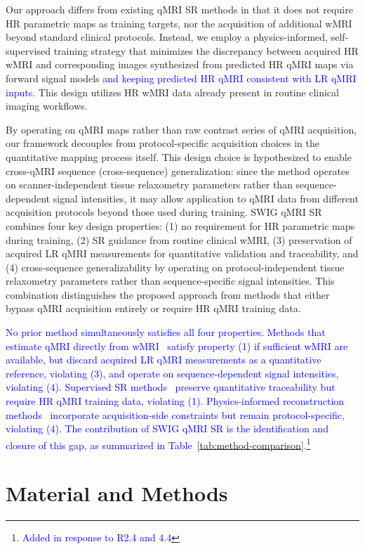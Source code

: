 \documentclass[journal,twoside,web]{ieeecolor}
\newcommand{\added}[1]{\textcolor{blue}{#1}}      %
\begin{document}
Our approach differs from existing qMRI SR methods in that it does not require HR parametric maps as training targets, nor the acquisition of additional wMRI beyond standard clinical protocols. Instead, we employ a physics-informed, self-supervised training strategy that minimizes the discrepancy between acquired HR wMRI and corresponding images synthesized from predicted HR qMRI maps via forward signal models \added{and keeping predicted HR qMRI consistent with LR qMRI inputs}. This design utilizes HR wMRI data already present in routine clinical imaging workflows.

By operating on qMRI maps rather than raw contrast series of qMRI acquisition, our framework decouples from protocol-specific acquisition choices in the quantitative mapping process itself. This design choice is hypothesized to enable cross-qMRI sequence (cross-sequence) generalization: since the method operates on scanner-independent tissue relaxometry parameters rather than sequence-dependent signal intensities, it may allow application to qMRI data from different acquisition protocols beyond those used during training.
SWIG qMRI SR combines four key design properties: (1) no requirement for HR parametric maps during training, (2) SR guidance from routine clinical wMRI, (3) preservation of acquired LR qMRI measurements for quantitative validation and traceability, and (4) cross-sequence generalizability by operating on protocol-independent tissue relaxometry parameters rather than sequence-specific signal intensities. This combination distinguishes the proposed approach from methods that either bypass qMRI acquisition entirely or require HR qMRI training data. 

\added{No prior method simultaneously satisfies all four properties. Methods that estimate qMRI directly from wMRI~\cite{b5,b6,b7} satisfy property (1) if sufficient wMRI are available, but discard acquired LR qMRI measurements as a quantitative reference, violating (3), and 
operate on sequence-dependent signal intensities, violating (4). Supervised SR methods~\cite{b4} preserve quantitative traceability but require HR qMRI training data, violating (1). Physics-informed reconstruction methods~\cite{b3} incorporate acquisition-side constraints but remain protocol-specific, violating (4). The  contribution of SWIG qMRI SR is the identification and closure of this gap, as summarized in Table~\ref{tab:method-comparison}.\footnote{\textcolor{blue}{Added in response to R2.4 and 4.4}}}


\section{Material and Methods}
\end{document}
